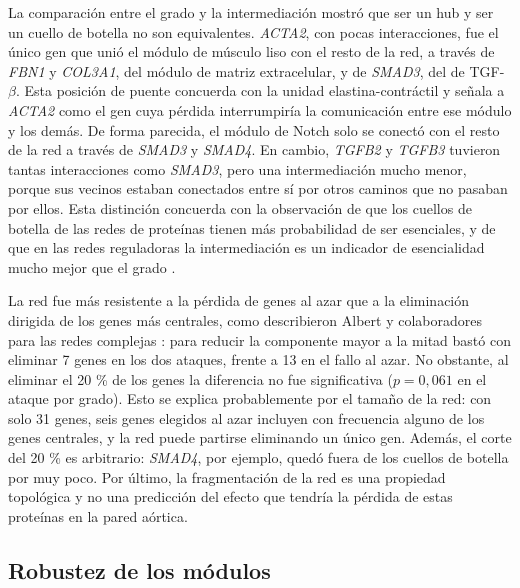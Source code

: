 La comparación entre el grado y la intermediación mostró que ser un hub y ser un cuello de botella no son equivalentes. \textit{ACTA2}, con pocas interacciones, fue el único gen que unió el módulo de músculo liso con el resto de la red, a través de \textit{FBN1} y \textit{COL3A1}, del módulo de matriz extracelular, y de \textit{SMAD3}, del de TGF-$\beta$. Esta posición de puente concuerda con la unidad elastina-contráctil \cite{Karimi2016} y señala a \textit{ACTA2} como el gen cuya pérdida interrumpiría la comunicación entre ese módulo y los demás. De forma parecida, el módulo de Notch solo se conectó con el resto de la red a través de \textit{SMAD3} y \textit{SMAD4}. En cambio, \textit{TGFB2} y \textit{TGFB3} tuvieron tantas interacciones como \textit{SMAD3}, pero una intermediación mucho menor, porque sus vecinos estaban conectados entre sí por otros caminos que no pasaban por ellos. Esta distinción concuerda con la observación de que los cuellos de botella de las redes de proteínas tienen más probabilidad de ser esenciales, y de que en las redes reguladoras la intermediación es un indicador de esencialidad mucho mejor que el grado \cite{Yu2007}.

La red fue más resistente a la pérdida de genes al azar que a la eliminación dirigida de los genes más centrales, como describieron Albert y colaboradores para las redes complejas \cite{Albert2000}: para reducir la componente mayor a la mitad bastó con eliminar 7 genes en los dos ataques, frente a 13 en el fallo al azar. No obstante, al eliminar el 20 \% de los genes la diferencia no fue significativa ($p = 0{,}061$ en el ataque por grado). Esto se explica probablemente por el tamaño de la red: con solo 31 genes, seis genes elegidos al azar incluyen con frecuencia alguno de los genes centrales, y la red puede partirse eliminando un único gen. Además, el corte del 20 \% es arbitrario: \textit{SMAD4}, por ejemplo, quedó fuera de los cuellos de botella por muy poco. Por último, la fragmentación de la red es una propiedad topológica y no una predicción del efecto que tendría la pérdida de estas proteínas en la pared aórtica.

\subsection{Robustez de los módulos}

